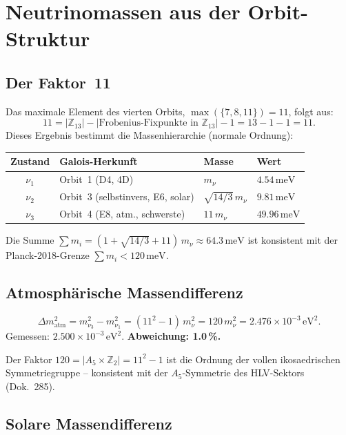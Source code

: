 \section{Neutrinomassen aus der Orbit-Struktur \KM}

\subsection{Der Faktor~11}

Das maximale Element des vierten Orbits, $\max(\{7,8,11\})=11$, folgt aus:
\[
11=|\mathbb{Z}_{13}|-|\text{Frobenius-Fixpunkte in }\mathbb{Z}_{13}|-1
  =13-1-1=11.
\]
Dieses Ergebnis bestimmt die Massenhierarchie (normale Ordnung):

\begin{center}
\begin{tabular}{clll}
\toprule
Zustand & Galois-Herkunft & Masse & Wert \\
\midrule
$\nu_1$ & Orbit~1 (D4, 4D) & $m_\nu$ & $4.54\,\text{meV}$ \\
$\nu_2$ & Orbit~3 (selbstinvers, E6, solar) & $\sqrt{14/3}\,m_\nu$ & $9.81\,\text{meV}$ \\
$\nu_3$ & Orbit~4 (E8, atm., schwerste) & $11\,m_\nu$ & $49.96\,\text{meV}$ \\
\bottomrule
\end{tabular}
\end{center}

Die Summe $\sum m_i=(1+\sqrt{14/3}+11)\,m_\nu\approx64.3\,\text{meV}$
ist konsistent mit der Planck-2018-Grenze $\sum m_i<120\,\text{meV}$.

\subsection{Atmosphärische Massendifferenz}

\[
\Delta m^2_\text{atm}=m_{\nu_3}^2-m_{\nu_1}^2
=(11^2-1)\,m_\nu^2=120\,m_\nu^2
=2.476\times10^{-3}\,\text{eV}^2.
\]
Gemessen: $2.500\times10^{-3}\,\text{eV}^2$.
\textbf{Abweichung: 1.0\,\%.}

Der Faktor $120=|A_5\times\mathbb{Z}_2|=11^2-1$ ist die Ordnung der
vollen ikosaedrischen Symmetriegruppe -- konsistent mit der
$A_5$-Symmetrie des HLV-Sektors (Dok.~285).

\subsection{Solare Massendifferenz}

